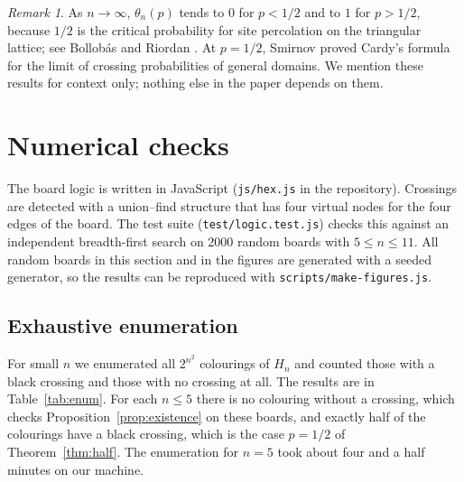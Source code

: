 \documentclass[11pt,a4paper]{amsart}
\theoremstyle{definition}
\theoremstyle{remark}
\newtheorem{remark}[theorem]{Remark}
\begin{document}
\begin{remark}
As $n \to \infty$, $\theta_n(p)$ tends to $0$ for $p < 1/2$ and to $1$ for $p > 1/2$, because $1/2$ is the critical probability for site percolation on the triangular lattice; see Bollob\'as and Riordan \cite{bollobas-riordan}. At $p = 1/2$, Smirnov \cite{smirnov} proved Cardy's formula for the limit of crossing probabilities of general domains. We mention these results for context only; nothing else in the paper depends on them.
\end{remark}

\section{Numerical checks}\label{sec:numerics}

The board logic is written in JavaScript (\texttt{js/hex.js} in the repository). Crossings are detected with a union--find structure that has four virtual nodes for the four edges of the board. The test suite (\texttt{test/logic.test.js}) checks this against an independent breadth-first search on 2000 random boards with $5 \le n \le 11$. All random boards in this section and in the figures are generated with a seeded generator, so the results can be reproduced with \texttt{scripts/make-figures.js}.

\subsection{Exhaustive enumeration}

For small $n$ we enumerated all $2^{n^2}$ colourings of $H_n$ and counted those with a black crossing and those with no crossing at all. The results are in Table~\ref{tab:enum}. For each $n \le 5$ there is no colouring without a crossing, which checks Proposition~\ref{prop:existence} on these boards, and exactly half of the colourings have a black crossing, which is the case $p = 1/2$ of Theorem~\ref{thm:half}. The enumeration for $n = 5$ took about four and a half minutes on our machine.

\begin{table}[h]
  \centering
  \caption{Exhaustive enumeration of all colourings of $H_n$.}\label{tab:enum}
\end{table}
\end{document}
